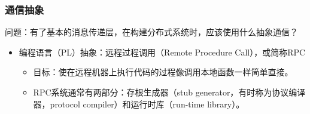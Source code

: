 \begin{frame}[fragile]
    \frametitle{通信抽象}
    问题：有了基本的消息传递层，在构建分布式系统时，应该使用什么抽象通信？
    \begin{itemize}
        \item 编程语言（PL）抽象：远程过程调用（Remote Procedure Call），或简称RPC
        \begin{itemize}
            \item 目标：使在远程机器上执行代码的过程像调用本地函数一样简单直接。
            \item RPC系统通常有两部分：存根生成器（stub generator，有时称为协议编译器，protocol compiler）和运行时库（run-time library）。
        \end{itemize}
    \end{itemize}
    
\end{frame}

